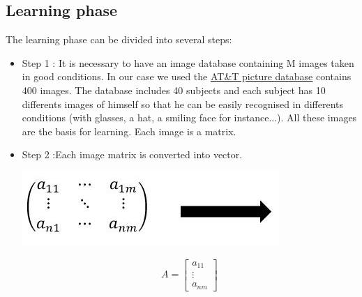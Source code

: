 \subsection{Learning phase}
 The learning phase can be divided into several steps:
 \begin{itemize}
 \item Step 1 : It is necessary to have an image database containing M images taken in good conditions. In our case we used the  \href{http://www.cl.cam.ac.uk/Research/DTG/attarchive:pub/data/att_faces.zip}{AT\&T picture database} contains 400 images. The database includes 40 subjects and each subject has 10 differents images of himself so that he can be easily recognised in differents conditions (with glasses, a hat, a smiling face for instance...). All these images are the basis for learning. Each image is a matrix.
 \item Step 2 :Each image matrix is converted into vector.










\parbox{0.60\linewidth}{\includegraphics[scale=0.75]{matrice2vector}%
}
\parbox{0.15\linewidth}{


\begin{displaymath} A=\left[\begin{array}{ccc}
a_{11} \\
\vdots \\
a_{nm} 
\end{array}\right] \end{displaymath}
}




\end{itemize}
